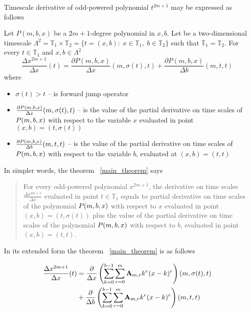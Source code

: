 Timescale derivative of odd-powered polynomial $t^{2m+1}$ may be expressed as follows
\begin{thm}
    \label{main_theorem}
    Let $P(m,b,x)$ be a $2m+1$-degree polynomial in $x,b$.
    Let be a two-dimensional timescale
    $\Lambda^2 = \mathbb{T}_1 \times \mathbb{T}_2 = \{t=(x, b) \colon \; x\in\mathbb{T}_1, \; b\in\mathbb{T}_2 \}$
    such that $\mathbb{T}_1 = \mathbb{T}_2$.
    For every $t\in\mathbb{T}_1$ and $x,b\in \Lambda^2$
    \[
        \frac{\Delta x^{2m+1}}{\Delta x}(t) =
        \frac{\partial P(m,b,x)}{\Delta x} (m, \sigma(t), t) +
        \frac{\partial P(m,b,x)}{\Delta b} (m, t, t)
    \]
    where
    \begin{itemize}
        \setlength\itemsep{1em}
        \item  $\sigma(t) > t$ -- is forward jump operator

        \item $\frac{\partial P ( m, b, x )}{\Delta x} (m, \sigma(t), t)$ --
        is the value of the partial derivative on time scales of
        $P ( m, b, x )$ with respect to the variable $x$ evaluated in point $(x, b)=  (t, \sigma(t))$

        \item $\frac{\partial P ( m, b, x )}{\Delta b} (m, t, t)$ --
        is the value of the partial derivative on time scales of
        $P ( m, b, x )$ with respect to the variable $b$, evaluated at $(x,b) = (t, t)$
    \end{itemize}
\end{thm}
In simpler words, the theorem ~\ref{main_theorem} says
\begin{center}
    \begin{quotation}
        For every odd-powered polynomial $x^{2m+1}$, the derivative on time scales $\frac{\Delta x^{2m+1}}{\Delta x}$
        evaluated in point $t\in\mathbb{T}_1$ equals to partial derivative on time scales of the polynomial
        $P ( m, b, x )$
        with respect to $x$
        evaluated in point
        $(x,b) = (t, \sigma(t))$
        plus the value of the partial derivative on time scales of the polynomial
        $P ( m, b, x )$
        with respect to $b$,
        evaluated in point
        $(x,b)=(t,t)$.
    \end{quotation}
\end{center}

In its extended form the theorem ~\ref{main_theorem} is as follows

\begin{align*}
    \frac{\Delta x^{2m+1}}{\Delta x}(t)
    &= \frac{\partial}{\Delta x} \left( \sum_{k=0}^{b-1} \sum_{r=0}^{m} {\mathbf{A}} \sb{m,r} k^r(x-k)^r \right) (m, \sigma(t), t) \\
    &+ \frac{\partial}{\Delta b} \left( \sum_{k=0}^{b-1} \sum_{r=0}^{m} {\mathbf{A}} \sb{m,r} k^r(x-k)^r \right) (m, t, t)
\end{align*}
